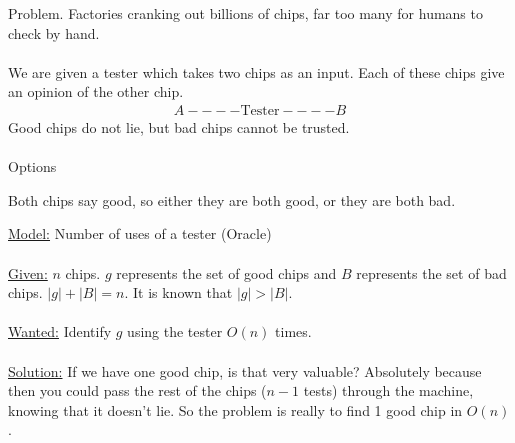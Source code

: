 \documentclass[class=scrartcl, crop=false]{standalone}
\begin{document}
\begin{example}
  Problem. Factories cranking out billions of chips, far too many for humans to check by hand.
  \\\\
  We are given a tester which takes two chips as an input. Each of these chips give an opinion of the other chip.
  \begin{gather*}
    A ---- \text{Tester} ---- B
  \end{gather*} 
  Good chips do not lie, but bad chips cannot be trusted.
  \\\\
  Options
  \begin{itemize}
    \ii[GG:]
    Both chips say good, so either they are both good, or they are both bad.
    \ii[BB:]
    \ii[BG:]
    \ii[GB:]
  \end{itemize} 

  \ul{Model:} Number of uses of a tester (Oracle)
  \\\\
  \ul{Given:} $n$ chips. $g$ represents the set of good chips and $B$ represents the set of bad chips. $|g| + |B| = n$. It is known that $|g| > |B|$.
  \\\\
  \ul{Wanted:} Identify $g$ using the tester $O(n)$ times.
  \\\\
  \ul{Solution:} If we have one good chip, is that very valuable? Absolutely because then you could pass the rest of the chips ($n - 1$ tests) through the machine, knowing that it doesn't lie. So the problem is really to find 1 good chip in $O(n)$.


\end{example}
\end{document}
